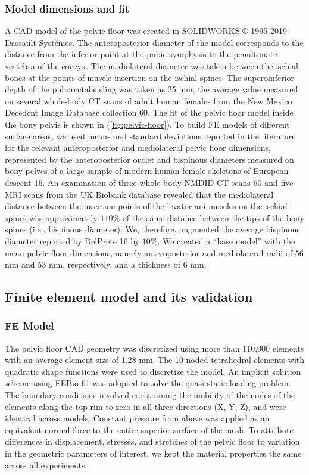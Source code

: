 \documentclass[9pt,twocolumn,twoside]{pnas-new}
\begin{document}
\subsubsection*{Model dimensions and fit}
A CAD model of the pelvic floor was created in SOLIDWORKS © 1995-2019 Dassault Systémes. The anteroposterior diameter of the model corresponds to the distance from the inferior point at the pubic symphysis to the penultimate vertebra of the coccyx. The mediolateral diameter was taken between the ischial bones at the points of muscle insertion on the ischial spines. The superoinferior depth of the puborectalis sling was taken as 25 mm, the average value measured on several whole-body CT scans of adult human females from the New Mexico Decedent Image Database collection 60. The fit of the pelvic floor model inside the bony pelvis is shown in (\cref{fig:pelvic-floor}). 
To build FE models of different surface areas, we used means and standard deviations reported in the literature for the relevant anteroposterior and mediolateral pelvic floor dimensions, represented by the anteroposterior outlet and bispinous diameters measured on bony pelves of a large sample of modern human female skeletons of European descent 16. An examination of three whole-body NMDID CT scans 60 and five MRI scans from the UK Biobank database revealed that the mediolateral distance between the insertion points of the levator ani muscles on the ischial spines was approximately $110\%$ of the same distance between the tips of the bony spines (i.e., bispinous diameter). We, therefore, augmented the average bispinous diameter reported by DelPrete 16 by $10\%$. We created a ``base model” with the mean pelvic floor dimensions, namely anteroposterior and mediolateral radii of 56 mm and 53 mm, respectively, and a thickness of 6 mm.
\subsection*{Finite element model and its validation}
\subsubsection*{FE Model}
The pelvic floor CAD geometry was discretized using more than 110,000 elements with an average element size of 1.28 mm. The 10-noded tetrahedral elements with quadratic shape functions were used to discretize the model. An implicit solution scheme using FEBio 61 was adopted to solve the quasi-static loading problem. The boundary conditions involved constraining the mobility of the nodes of the elements along the top rim to zero in all three directions (X, Y, Z), and were identical across models. Constant pressure from above was applied as an equivalent normal force to the entire superior surface of the mesh. To attribute differences in displacement, stresses, and stretches of the pelvic floor to variation in the geometric parameters of interest, we kept the material properties the same across all experiments. 
\end{document}
